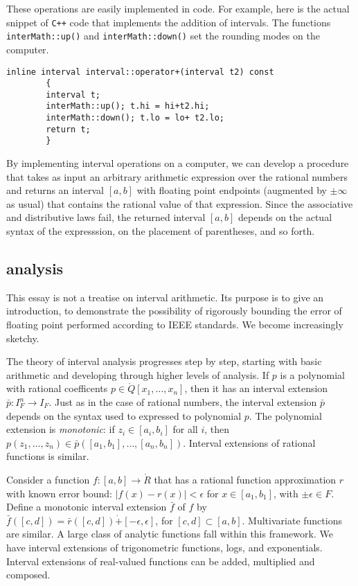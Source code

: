 These operations are easily implemented in code.  For example, here is the actual snippet of 
{\tt C++} code that implements the addition of intervals.  The functions
{\tt interMath::up()} and {\tt interMath::down()} set the rounding modes on the 
computer.  
\begin{verbatim}
inline interval interval::operator+(interval t2) const
        {
        interval t;
        interMath::up(); t.hi = hi+t2.hi;
        interMath::down(); t.lo = lo+ t2.lo;
        return t;
        }
\end{verbatim}

By implementing interval operations on a computer, we can develop a procedure that
takes as input 
an arbitrary arithmetic expression over the rational numbers and returns an
interval $[a,b]$ with floating point endpoints (augmented by $\pm\infty$ as usual)
that contains the rational value of that expression.
Since the associative and distributive laws fail, the returned interval
 $[a,b]$ depends on the actual syntax of the expresssion, on  the placement of parentheses,
and so forth.



\subsection{analysis}

This essay is not a treatise on interval arithmetic.  Its purpose
is to give an introduction, to demonstrate the possibility of rigorously
bounding the error of floating point performed according to IEEE standards.
We become increasingly sketchy.

The theory of interval analysis progresses step by step, starting with
basic arithmetic and developing through higher levels of analysis.
If $p$ is a polynomial with rational coefficents $p\in\ring{Q}[x_1,\ldots,x_n]$, then it has an interval
extension $\bar p : I_F^n \to I_F$.  Just as in the case of rational
numbers, the interval extension $\bar p$ depends on the syntax used to
expressed to polynomial $p$.    The polynomial extension is {\it monotonic}:
  if $z_i\in [a_i,b_i]$ for all $i$, then
$p(z_1,\ldots,z_n) \in \bar p([a_1,b_1],\ldots,[a_n,b_n])$.
Interval extensions of rational functions is similar.

Consider a function $f:[a,b]\to\ring{R}$ that
has a rational function approximation $r$ with known
error bound:  $|f(x) - r(x)|<\epsilon$ for $x\in[a_1,b_1]$,
with $\pm\epsilon\in F$.
Define a monotonic interval extension $\bar f$ of $f$ by
$\bar f([c,d]) = \bar r([c,d]) \dot + [-\epsilon,\epsilon]$, for
$[c,d]\subset [a,b]$.  
Multivariate functions are similar.   
%
A large class of analytic functions fall within this framework.
We have interval extensions of trigonometric functions, logs, and
exponentials.  Interval extensions of real-valued functions can be
added, multiplied and composed.  


